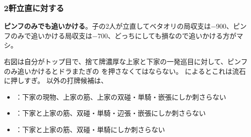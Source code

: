 \documentclass[../nankiru_main.tex]{subfiles}
\begin{document}
\onecolumn %
\subsubsection*{2軒立直に対する}

\begin{minipage}[t]{\textwidth}
  \begin{figure}\vspace{-1.5\topskip}
  \end{figure}

  \textbf{ピンフのみでも追いかける}\citep[][pp.~151--152]{miinin-choice}。子の2人が立直してベタオリの局収支は$-$900、ピンフのみで追いかける局収支は$-700$、どっちにしても損なので追いかける方がマシ。
  
  右図は自分がトップ目で、捨て牌濃厚な上家と下家の一発巡目に対して、ピンフのみ追いかけるとドラまたぎの  を押さなくてはならない。\citet[pp.~178--181]{doi} によるとこれは流石に押しすぎ。 以外の打牌候補は、
  
  \begin{itemize}
  \item {}：下家の現物、上家の筋、上家の双碰・単騎・嵌張にしか刺さらない
  \item {}：下家と上家の筋、双碰・単騎・辺張・嵌張にしか刺さらない
  \item {}：下家と上家の筋、双碰・単騎にしか刺さらない
  \end{itemize}
  
\end{minipage}
\end{document}

